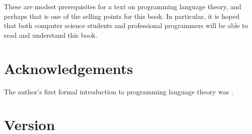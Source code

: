     These are modest prerequisites for a text on programming language theory, and perhaps that is one of the selling points for this book. In particular, it is hoped that both computer science students and professional programmers will be able to read and understand this book.

  \section*{Acknowledgements}

    The author's first formal introduction to programming language theory was \textcite{tapl}.

  \section*{Version}

    

